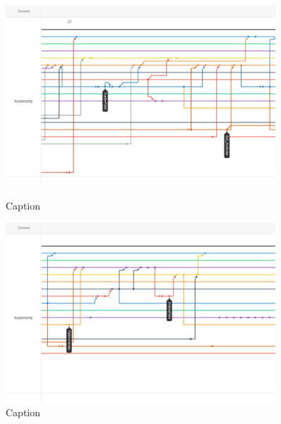 \begin{figure}
    \includegraphics[width=0.9\textwidth]{Report/root/7.png}
    \caption{Caption}
    \includegraphics[width=0.9\textwidth]{Report/root/8.png}
    \caption{Caption}
    \end{figure}
